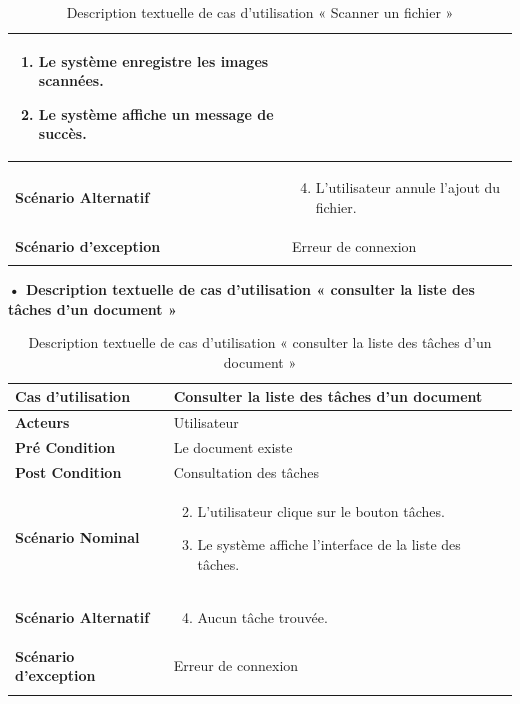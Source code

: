 \begin{longtable}{|p{5cm}|p{10cm}|}
\begin{enumerate}
    \item Le système enregistre les images scannées.
    \item Le système affiche un message de succès.
\end{enumerate}\\
\hline
\textbf{Scénario Alternatif}&
\vspace{-\baselineskip}
\begin{enumerate}
    \setcounter{enumi}{3}
    \item L'utilisateur annule l'ajout du fichier.
\end{enumerate}\\
\hline
\textbf{Scénario d'exception}&Erreur de connexion\\
\hline
\caption{Description textuelle de cas d'utilisation « Scanner un fichier »}
\label{tab:DescriptionTextuelleDeCasDUtilisationScannerUnFichier}

\end{longtable}


\textbf{•	Description textuelle de cas d'utilisation « consulter la liste des tâches d'un document »}

\begin{longtable}{|p{5cm}|p{10cm}|}
\hline
\textbf{Cas d'utilisation}&Consulter la liste des tâches d'un document\\
\hline
\textbf{Acteurs}&Utilisateur\\
\hline
\textbf{Pré Condition}&Le document existe\\
\hline
\textbf{Post Condition}&Consultation des tâches\\
\hline
\textbf{Scénario Nominal}&
\vspace{-\baselineskip}
\begin{enumerate}
    \setcounter{enumi}{1}
    \item L'utilisateur clique sur le bouton tâches.
    \item Le système affiche l'interface de la liste des tâches.
    
\end{enumerate}\\
\hline
\textbf{Scénario Alternatif}&
\vspace{-\baselineskip}
\begin{enumerate}
    \setcounter{enumi}{3}
    \item Aucun tâche trouvée.
\end{enumerate}\\
\hline
\textbf{Scénario d'exception}&Erreur de connexion\\
\hline
\caption{Description textuelle de cas d'utilisation « consulter la liste des tâches d'un document »}
\label{tab:DescriptionTextuelleDeCasDUtilisationConsulterLaListeDesTachesDUnDocument}
\end{longtable}



